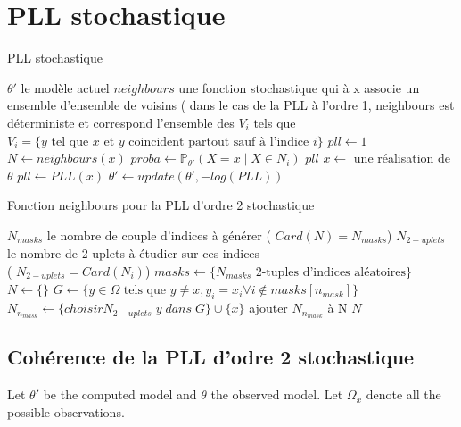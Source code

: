 \documentclass[11 pt]{article}
\begin{document}
\section{PLL stochastique}
\begin{algorithm}
\caption{PLL stochastique}\label{alg:pll}
\begin{algorithmic}
\Require $\theta '$ le modèle actuel 
\Require $neighbours$ une fonction stochastique qui à x associe un ensemble d'ensemble de voisins ( dans le cas de la PLL à l'ordre 1, neighbours est déterministe et correspond l'ensemble des  $V_i$ tels que $V_i = \{y \text{ tel que $x$ et $y$ coincident partout sauf à l'indice $i$}\}$
\State $pll \gets 1$
\State $N \gets neighbours(x) $
\State $proba \gets \mathbb{P}_{\theta '} (X=x \mid X \in N_i)$  
\EndFor
\Return $pll$
\EndFunction
{}
\State $x \gets$ une réalisation de $\theta$
\State $pll \gets PLL(x)$
\State $\theta ' \gets update(\theta ', -log(PLL))$
\EndWhile
\end{algorithmic}
\end{algorithm}
\begin{algorithm}
\caption{Fonction neighbours pour la PLL d'ordre 2 stochastique}\label{alg:neig2}
\begin{algorithmic}
	\Require $N_{masks}$ le nombre de couple d'indices à générer ( $Card(N) = N_{masks} $)
	\Require $N_{2-uplets}$ le nombre de 2-uplets à étudier sur ces indices\\ ( $ N_{2-uplets} = Card(N_i) $)
\State $masks \gets  \{ N_{masks} \text{ 2-tuples d'indices aléatoires} \}$
\State $N \gets \{\}$
\State $G \gets \{ y \in \Omega \text{ tels que } y \neq x, y_i = x_i \forall i \notin masks[n_{mask}] \}$
\State $N_{n_{mask}} \gets \{choisir N_{2-uplets}\; y\; dans \; G\} \cup \{x\}$
\State ajouter $N_{n_{mask}}$ à N
\EndFor
\Return $N$
\EndFunction
\end{algorithmic}
\end{algorithm}

\newpage

\subsection{Cohérence de la PLL d'odre 2 stochastique}
Let $\theta'$ be the computed model and $\theta$ the observed model. Let $\Omega_x$ denote all the possible observations.

\quad
\end{document}
